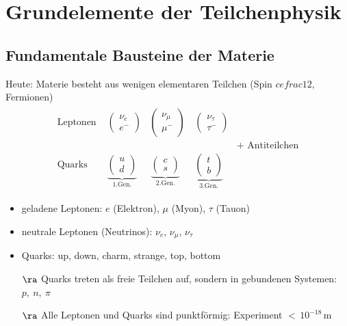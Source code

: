 \chapter{Grundelemente der Teilchenphysik}
\section{Fundamentale Bausteine der Materie}
Heute: Materie besteht aus wenigen elementaren Teilchen (Spin $cefrac{1}{2}$, Fermionen)
\begin{align*}\begin{matrix}
\text{Leptonen }& \begin{pmatrix} \nu_e \\ e^- \end{pmatrix}& \begin{pmatrix} \nu_\mu \\ \mu^- \end{pmatrix}&\, \begin{pmatrix} \nu_\tau \\ \tau^- \end{pmatrix} & \\
& & & & + \text{ Antiteilchen} \\
\text{Quarks }& \underbrace{\begin{pmatrix} u \\ d \end{pmatrix}}_{1.\text{Gen.}} & \, \underbrace{\begin{pmatrix} c \\ s \end{pmatrix}}_{2.\text{Gen.}} &\, \underbrace{\begin{pmatrix} t \\ b \end{pmatrix}}_{3.\text{Gen.}} & 
\end{matrix}
\end{align*}
\begin{itemize}
\item geladene Leptonen: $e$ (Elektron), $\mu$ (Myon), $\tau$ (Tauon)
\item neutrale Leptonen (Neutrinos): $\nu_e$, $\nu_\mu$, $\nu_\tau$ 
\item Quarks: up, down, charm, strange, top, bottom
\item[$\ra$] Quarks treten  als freie Teilchen auf, sondern in gebundenen Systemen: $p, \ n, \ \pi$
\item[$\ra$] Alle Leptonen und Quarks sind \glqq punktförmig\grqq: Experiment $<\, 10^{-18}$\,m
\end{itemize}

